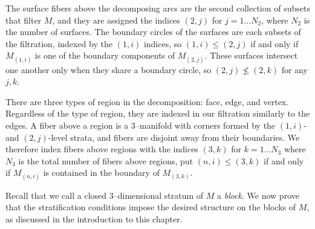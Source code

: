The surface fibers above the decomposing arcs are the second collection of subsets that filter $M$, and they are assigned the indices $(2,j)$ for $j=1\dots N_2$, where $N_2$ is the number of surfaces.
The boundary circles of the surfaces are each subsets of the filtration, indexed by the $(1,i)$ indices, so $(1,i)\leq (2,j)$ if and only if $M_{(1,i)}$ is one of the boundary components of $M_{(2,j)}$.
These surfaces intersect one another only when they share a boundary circle, so $(2,j)\nleq (2,k)$ for any $j,k$.

There are three types of region in the decomposition: face, edge, and vertex.
Regardless of the type of region, they are indexed in our filtration similarly to the edges.
A fiber above a region is a 3--manifold with corners formed by the $(1,i)$- and $(2,j)$-level strata, and fibers are disjoint away from their boundaries.
We therefore index fibers above regions with the indices $(3,k)$ for $k=1\dots N_3$ where $N_3$ is the total number of fibers above regions, put $(n,i)\leq (3,k)$ if and only if $M_{(n,i)}$ is contained in the boundary of $M_{(3,k)}$.

Recall that we call a closed 3--dimensional stratum of $M$ a \emph{block}.
We now prove that the stratification conditions impose the desired structure on the blocks of $M$, as discussed in the introduction to this chapter.

